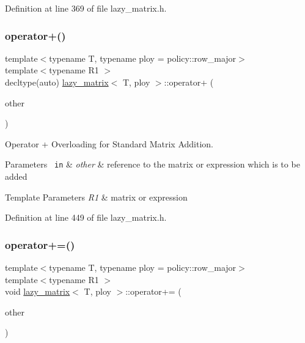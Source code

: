 Definition at line 369 of file lazy\+\_\+matrix.\+h.

\mbox{\label{classlazy__matrix_a7c5d07e16aeeadbd2a40e3abee1c9ca3}} 
\subsubsection{\texorpdfstring{operator+()}{operator+()}}
{\footnotesize\ttfamily template$<$typename T, typename ploy = policy\+::row\+\_\+major$>$ \\
template$<$typename R1 $>$ \\
decltype(auto) \mbox{\hyperlink{classlazy__matrix}{lazy\+\_\+matrix}}$<$ T, ploy $>$\+::operator+ (\begin{DoxyParamCaption}\item[{const R1 \&}]{other }\end{DoxyParamCaption})\hspace{0.3cm}{\ttfamily [inline]}}



Operator + Overloading for Standard Matrix Addition. 


\begin{DoxyParams}[1]{Parameters}
\mbox{\texttt{ in}}  & {\em other} & reference to the matrix or expression which is to be added\\
\hline
\end{DoxyParams}

\begin{DoxyTemplParams}{Template Parameters}
{\em R1} & matrix or expression \\
\hline
\end{DoxyTemplParams}


Definition at line 449 of file lazy\+\_\+matrix.\+h.

\mbox{\label{classlazy__matrix_a00cb7c5564344e23ed3c248324993321}} 
\subsubsection{\texorpdfstring{operator+=()}{operator+=()}}
{\footnotesize\ttfamily template$<$typename T, typename ploy = policy\+::row\+\_\+major$>$ \\
template$<$typename R1 $>$ \\
void \mbox{\hyperlink{classlazy__matrix}{lazy\+\_\+matrix}}$<$ T, ploy $>$\+::operator+= (\begin{DoxyParamCaption}\item[{const R1 \&}]{other }\end{DoxyParamCaption})\hspace{0.3cm}{\ttfamily [inline]}}



